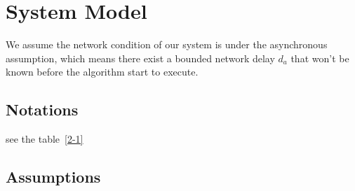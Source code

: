 \chapter{System Model}
\label{c:sysmodel}
We assume the network condition of our system is under the asynchronous assumption, 
which means there exist a bounded network delay $d_a$ that won't be known before the algorithm start to execute. \par




\section{Notations}
see the table~\ref{2-1}


\section{Assumptions}
